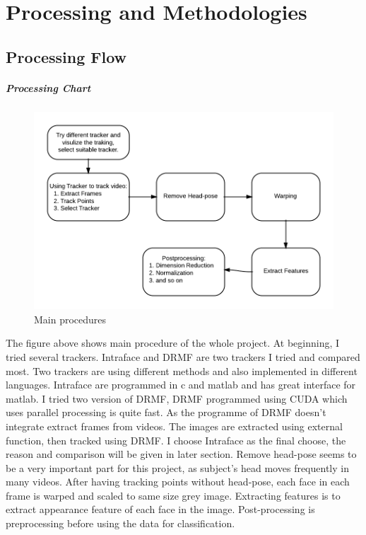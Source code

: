\chapter{Processing and Methodologies}

\section{Processing Flow}
\paragraph{Processing Chart}
\begin{figure}[ht!]
\centering
\includegraphics[width=150mm]{imgs/ProcedureChart.png}
\caption{Main procedures}
\end{figure}
The figure above shows main procedure of the whole project. At beginning, I tried several trackers. Intraface and DRMF are two trackers I tried and compared most. Two trackers are using different methods and also implemented in different languages. Intraface are programmed in c and matlab and has great interface for matlab. I tried two version of DRMF, DRMF programmed using CUDA which uses parallel processing is quite fast. As the programme of DRMF doesn't integrate extract frames from videos. The images are extracted using external function, then tracked using DRMF. I choose Intraface as the final choose, the reason and comparison will be given in later section. Remove head-pose seems to be a very important part for this project, as subject's head moves frequently in many videos. After having tracking points without head-pose, each face in each frame is warped and scaled to same size grey image. Extracting features is to extract appearance feature of each face in the image. Post-processing is preprocessing before using the data for classification.
